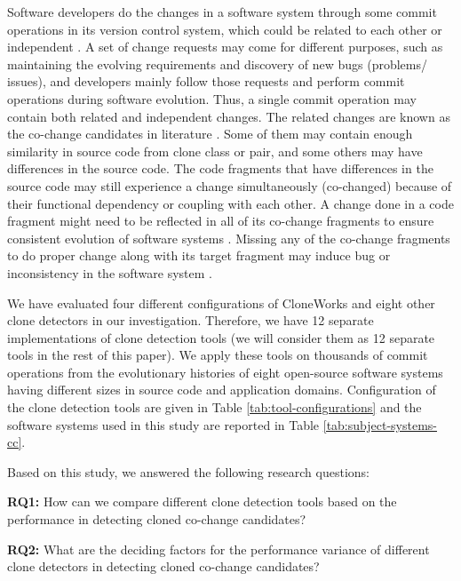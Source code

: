 \documentclass[review]{elsarticle}
\begin{document}
Software developers do the changes in a software system through some commit operations in its version control system, which could be related to each other or independent \cite{Mondal:Co-change-recommendation, Mondal:Connectivity:co-changed}. A set of change requests may come for different purposes, such as maintaining the evolving requirements and discovery of new bugs (problems/ issues), and developers mainly follow those requests and perform commit operations during software evolution. Thus, a single commit operation may contain both related and independent changes.  The related changes are known as the co-change candidates in literature \cite{Mondal-2014-PRC-2597073-2597104rankingCoChange}. Some of them may contain enough similarity in source code from clone class or pair, and some others may have differences in the source code. The code fragments that have differences in the source code may still experience a change simultaneously (co-changed) because of their functional dependency or coupling with each other.  A change done in a code fragment might need to be reflected in all of its co-change fragments to ensure consistent evolution of software systems \cite{Mondal:Association:Rules, Mondal:Context:Adaptation:Bugs}. Missing any of the co-change fragments to do proper change along with its target fragment may induce bug or inconsistency in the software system \cite{Judith:Bug:Replication, Judith:Micro:Regular:Clone}. 

We have evaluated four different configurations of CloneWorks \cite{CloneWorks-Jeff} and eight other clone detectors in our investigation. Therefore, we have 12 separate implementations of clone detection tools (we will consider them as 12 separate tools in the rest of this paper).  We apply these tools on thousands of commit operations from the evolutionary histories of eight open-source software systems having different sizes in source code and application domains. Configuration of the clone detection tools are given in Table \ref{tab:tool-configurations} and the software systems used in this study are reported in Table \ref{tab:subject-systems-cc}.

Based on this study, we answered the following research questions:

\vspace{0.15cm}
\noindent
\textbf{RQ1: }How can we compare different clone detection tools based on the performance in detecting cloned co-change candidates? 
 
\vspace{0.15cm}
\noindent
\textbf{RQ2: }What are the deciding factors for the performance variance of different clone detectors in detecting cloned co-change candidates?
\end{document}
